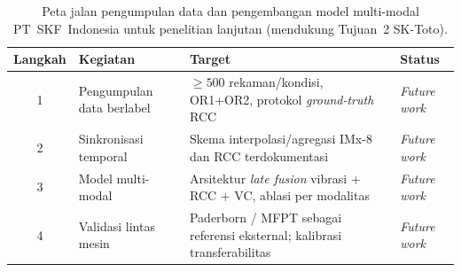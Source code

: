 \begin{table}[ht]
  \centering
  \caption{Peta jalan pengumpulan data dan pengembangan model multi-modal
           PT~SKF~Indonesia untuk penelitian lanjutan (mendukung Tujuan~2
           SK-Toto).}
  \label{tab:lampD_roadmap}
  \footnotesize
  \begin{tabularx}{\textwidth}{@{}c l X l@{}}
    \toprule
    \textbf{Langkah} & \textbf{Kegiatan} & \textbf{Target} & \textbf{Status} \\
    \midrule
    1 & Pengumpulan data berlabel & $\geq 500$ rekaman/kondisi, OR1+OR2,
        protokol \emph{ground-truth} RCC & \emph{Future work} \\
    2 & Sinkronisasi temporal & Skema interpolasi/agregasi IMx-8 dan RCC
        terdokumentasi & \emph{Future work} \\
    3 & Model multi-modal & Arsitektur \emph{late fusion} vibrasi + RCC + VC,
        ablasi per modalitas & \emph{Future work} \\
    4 & Validasi lintas mesin & Paderborn / MFPT sebagai referensi eksternal;
        kalibrasi transferabilitas & \emph{Future work} \\
    \bottomrule
  \end{tabularx}
\end{table}
